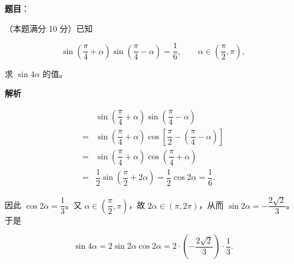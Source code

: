 \begin{answer}

\textbf{题目}：

（本题满分 10 分）已知

\nopagebreak[4]
\[
\sin\left(\dfrac{\pi}{4}+\alpha\right)\sin\left(\dfrac{\pi}{4}-\alpha\right)=\dfrac16,\qquad \alpha\in\left(\dfrac\pi2,\pi\right),
\]

求 $\sin4\alpha$ 的值。

\textbf{解析}

\nopagebreak[4]
\[
\begin{aligned}
&\sin\left(\dfrac\pi4+\alpha\right)\sin\left(\dfrac\pi4-\alpha\right)\\
={}&\sin\left(\dfrac\pi4+\alpha\right)\cos\left[\dfrac\pi2-\left(\dfrac\pi4-\alpha\right)\right]\\
={}&\sin\left(\dfrac\pi4+\alpha\right)\cos\left(\dfrac\pi4+\alpha\right)\\
={}&\dfrac12\sin\left(\dfrac\pi2+2\alpha\right)
=\dfrac12\cos2\alpha=\dfrac16.
\end{aligned}
\]

因此 $\cos2\alpha=\dfrac13$。又 $\alpha\in(\dfrac\pi2,\pi)$，故 $2\alpha\in(\pi,2\pi)$，从而 $\sin2\alpha=-\dfrac{2\sqrt2}{3}$。于是

\nopagebreak[4]
\[
\sin4\alpha=2\sin2\alpha\cos2\alpha
=2\cdot\left(-\dfrac{2\sqrt2}{3}\right)\cdot\dfrac13.
\]


\end{answer}
